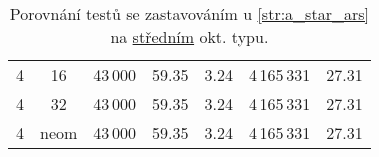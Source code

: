 \begin{table}[b!]
\begin{tabular}{c c r D{.}{,}{2.2}D{.}{,}{1.2} r D{.}{,}{2.2}}
		4 & 16   & 43\,000          & 59.35                                & 3.24 & 4\,165\,331          & 27.31                                \\
		4 & 32   & 43\,000          & 59.35                                & 3.24 & 4\,165\,331          & 27.31                                \\
		4 & neom & 43\,000          & 59.35                                & 3.24 & 4\,165\,331          & 27.31                                \\
		\bottomrule
	\end{tabular}
	\caption{Porovnání testů se zastavováním u \ref{str:a_star_ars} na \hyperref[par:data_stredni]{středním} okt. typu.}\label{tab:ars_exp_stredni_oktagonalni}
\end{table}

